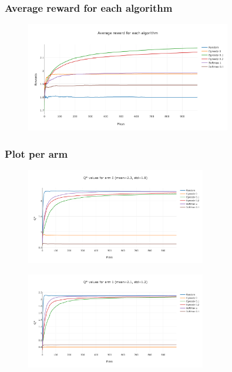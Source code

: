 \documentclass[11pt]{article}
\begin{document}
\subsubsection{Average reward for each algorithm}

\begin{figure}[H]
   \centering
   \includegraphics[width=0.8\textwidth]{img/1-2/reward.png}
\end{figure}

\subsubsection{Plot per arm}

\begin{figure}[H]
   \centering
   \includegraphics[width=0.7\textwidth]{img/1-2/q1.png}
\end{figure}

\begin{figure}[H]
   \centering
   \includegraphics[width=0.7\textwidth]{img/1-2/q2.png}
\end{figure}
\end{document}

